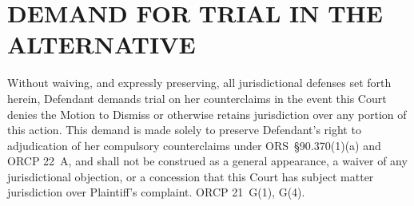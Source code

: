 \documentclass[10pt,letterpaper,oneside]{extarticle}
\begin{document}
\section{\textbf{DEMAND FOR TRIAL IN THE ALTERNATIVE}}
Without waiving, and expressly preserving, all
jurisdictional defenses set forth herein, Defendant demands
trial on her counterclaims in the event this Court denies
the Motion to Dismiss or otherwise retains jurisdiction
over any portion of this action. This demand is made solely
to preserve Defendant's right to adjudication of her
compulsory counterclaims under ORS~\S90.370(1)(a) and
ORCP 22~A, and shall not be construed as a general
appearance, a waiver of any jurisdictional objection, or a
concession that this Court has subject matter jurisdiction
over Plaintiff's complaint. ORCP 21~G(1), G(4).
\end{document}
